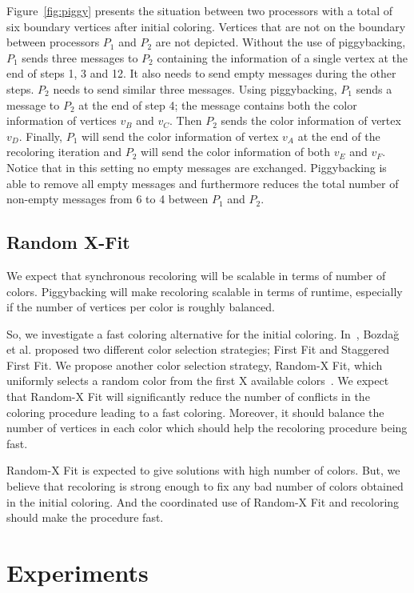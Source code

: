 \documentclass{article}
\begin{document}
Figure~\ref{fig:piggy} presents the situation between two processors
with a total of six boundary vertices after initial coloring. Vertices that are
not on the boundary between processors $P_1$ and $P_2$ are not
depicted. Without the use of piggybacking, $P_1$ sends three messages
to $P_2$ containing the information of a single vertex at the end of
steps 1, 3 and 12. It also needs to send empty messages during the
other steps. $P_2$ needs to send similar three messages. Using
piggybacking, $P_1$ sends a message to $P_2$ at the end of step 4; the
message contains both the color information of vertices $v_B$ and
$v_C$. Then $P_2$ sends the color information of vertex
$v_D$. Finally, $P_1$ will send the color information of vertex $v_A$
at the end of the recoloring iteration and $P_2$ will send the color
information of both $v_E$ and $v_F$. Notice that in this setting no
empty messages are exchanged. Piggybacking is able to remove all empty
messages and furthermore reduces the total number of non-empty
messages from 6 to 4 between $P_1$ and $P_2$.

\subsection{Random X-Fit}

We expect that synchronous recoloring will be scalable in terms of
number of colors. Piggybacking will make recoloring scalable in terms
of runtime, especially if the number of vertices per color is
roughly balanced.

So, we investigate a fast coloring alternative for the initial
coloring. In~\cite{BGMBC-jpdc}, Bozda\u{g} et al. proposed two
different color selection strategies; First Fit and Staggered First
Fit. We propose another color selection strategy, Random-X Fit, which
uniformly selects a random color from the first X available
colors~\cite{Gebremedhin02paralleldistance-k}. We expect that Random-X
Fit will significantly reduce the number of conflicts in the coloring
procedure leading to a fast coloring. Moreover, it should balance the
number of vertices in each color which should help the recoloring
procedure being fast.

Random-X Fit is expected to give solutions with high number of colors. But, we
believe that recoloring is strong enough to fix any bad number of
colors obtained in the initial coloring. And the coordinated use of
Random-X Fit and recoloring should make the procedure fast.

\section{Experiments}
\label{sec:expe}
\end{document}

